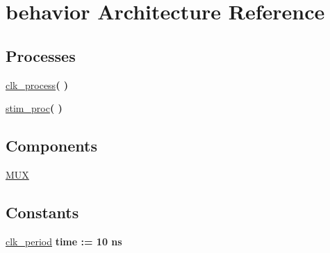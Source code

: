 \hypertarget{classmux__tb_1_1behavior}{\section{behavior \-Architecture \-Reference}
\label{classmux__tb_1_1behavior}
}
\*
\*
\subsection*{\-Processes}
 \begin{DoxyCompactItemize}
\item 
\hypertarget{classmux__tb_1_1behavior_ac5bb218131b813f7908ec89476b31fca}{\hyperlink{classmux__tb_1_1behavior_ac5bb218131b813f7908ec89476b31fca}{clk\-\_\-process}{\bfseries  (  )}}\label{classmux__tb_1_1behavior_ac5bb218131b813f7908ec89476b31fca}

\item 
\hypertarget{classmux__tb_1_1behavior_ad2efa6785cff833c341e27596b21aeb5}{\hyperlink{classmux__tb_1_1behavior_ad2efa6785cff833c341e27596b21aeb5}{stim\-\_\-proc}{\bfseries  (  )}}\label{classmux__tb_1_1behavior_ad2efa6785cff833c341e27596b21aeb5}

\end{DoxyCompactItemize}
\subsection*{\-Components}
 \begin{DoxyCompactItemize}
\item 
\hypertarget{classmux__tb_1_1behavior_a73760dea8da2e6f41a8c18e8bf78aa35}{\hyperlink{classmux__tb_1_1behavior_a73760dea8da2e6f41a8c18e8bf78aa35}{\-M\-U\-X}  {\bfseries }  }\label{classmux__tb_1_1behavior_a73760dea8da2e6f41a8c18e8bf78aa35}

\end{DoxyCompactItemize}
\subsection*{\-Constants}
 \begin{DoxyCompactItemize}
\item 
\hypertarget{classmux__tb_1_1behavior_a204a2fe2cd2e77cb28f30aeab011e19e}{\hyperlink{classmux__tb_1_1behavior_a204a2fe2cd2e77cb28f30aeab011e19e}{clk\-\_\-period} {\bfseries time  \-:=  10  ns } }\label{classmux__tb_1_1behavior_a204a2fe2cd2e77cb28f30aeab011e19e}

\end{DoxyCompactItemize}
